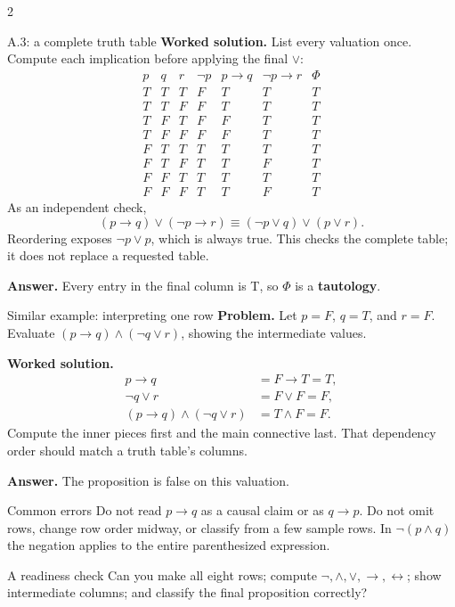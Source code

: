 \documentclass[10pt]{article}
\newcommand{\term}[1]{\textbf{\color{CoreNavy}#1}}
\begin{document}
\begin{multicols}{2}
\begin{workedbox}{A.3: a complete truth table}
\textbf{Worked solution.} List every valuation once. Compute each implication
before applying the final $\lor$:
\[
\begin{array}{ccc|c|c|c|c}
p&q&r&\neg p&p\to q&\neg p\to r&\Phi\\\hline
T&T&T&F&T&T&T\\
T&T&F&F&T&T&T\\
T&F&T&F&F&T&T\\
T&F&F&F&F&T&T\\
F&T&T&T&T&T&T\\
F&T&F&T&T&F&T\\
F&F&T&T&T&T&T\\
F&F&F&T&T&F&T
\end{array}
\]
As an independent check,
\[
(p\to q)\lor(\neg p\to r)
\equiv(\neg p\lor q)\lor(p\lor r).
\]
Reordering exposes $\neg p\lor p$, which is always true. This checks the
complete table; it does not replace a requested table.

\textbf{Answer.} Every entry in the final column is T, so $\Phi$ is a
\term{tautology}.
\end{workedbox}

\begin{workedbox}{Similar example: interpreting one row}
\textbf{Problem.} Let $p=F$, $q=T$, and $r=F$. Evaluate
$(p\to q)\land(\neg q\lor r)$, showing the intermediate values.

\textbf{Worked solution.}
\[
\begin{aligned}
p\to q&=F\to T=T,\\
\neg q\lor r&=F\lor F=F,\\
(p\to q)\land(\neg q\lor r)&=T\land F=F.
\end{aligned}
\]
Compute the inner pieces first and the main connective last. That dependency
order should match a truth table's columns.

\textbf{Answer.} The proposition is false on this valuation.
\end{workedbox}

\begin{warningbox}{Common errors}
Do not read $p\to q$ as a causal claim or as $q\to p$. Do not omit rows,
change row order midway, or classify from a few sample rows. In
$\neg(p\land q)$ the negation applies to the entire parenthesized expression.
\end{warningbox}

\begin{checklistbox}{A readiness check}
Can you make all eight rows; compute $\neg,\land,\lor,\to,\leftrightarrow$;
show intermediate columns; and classify the final proposition correctly?
\end{checklistbox}
\end{multicols}
\end{document}
